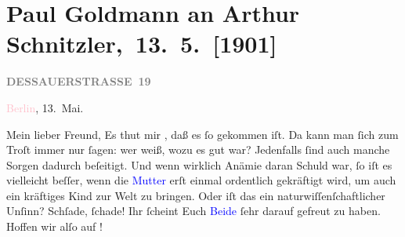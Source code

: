 

\renewcommand{\erwaehntePersonen}{Personen: Robert Hirschfeld, Karl Felix Kohler, Olga Schnitzler, Heinrich Schnitzler, Louise Schnitzler}
\renewcommand{\erwaehnteInstitutionen}{Institutionen: Neue Freie Presse}
\renewcommand{\erwaehnteOrte}{Orte: Berlin, Dessauer Straße, Klosters Dorf, Pörtschach, Schweiz, Velden am Wörthersee, Wien, Wörthersee}
\renewcommand{\erwaehnteWerke}{}
\section[ Paul Goldmann an Arthur Schnitzler, 13. 5. {[}1901{]}]{Paul Goldmann an Arthur Schnitzler, 13. 5. {[}1901{]}}
\nopagebreak{}
\rehead{ }\normalsize\beginnumbering{}
\toendnotes[C]{\smallbreak\pagebreak[2]}
\toendnotes[C]{\smallbreak}
\pstart
           \noindent{}\raggedleft{}{\pb}\textcolor{pink}{\textcolor{gray}{\textbf{DESSAUERSTRASSE 19}}}{}\ledrightnote{\textcolor{pink}{Dessauer Straße}}\pend
           
\pstart
           \textcolor{pink}{Berlin}{}\ledrightnote{\textcolor{pink}{Berlin}}, 13. Mai.\pend
           
\pstart\center{}Mein lieber Freund,\pend
\pstart
           Es thut mir \label{K_L03066-1v}\label{K_L03066-1h}, daß es ſo gekommen
               iſt. Da kann man ſich zum Troſt immer nur ſagen: wer weiß, wozu es gut war?
               Jedenfalls ſind auch manche Sorgen dadurch beſeitigt. Und wenn wirklich Anämie daran
               Schuld war, ſo iſt es vielleicht beſſer, wenn die \textcolor{blue}{Mutter}{}\ledrightnote{{$\rightarrow$}\textcolor{blue}{Olga Schnitzler}} erſt einmal ordentlich gekräftigt wird, um {\pb}auch ein kräftiges Kind zur Welt zu bringen. Oder
               iſt das ein naturwiſſenſchaftlicher Unſinn? Schſade, ſchade! Ihr ſcheint Euch \textcolor{blue}{Beide}{}\ledrightnote{{$\rightarrow$}\textcolor{blue}{Olga Schnitzler}} ſehr darauf gefreut zu
               haben. Hoffen wir alſo auf \label{K_L03066-2v}\label{K_L03066-2h}!\pend
           
